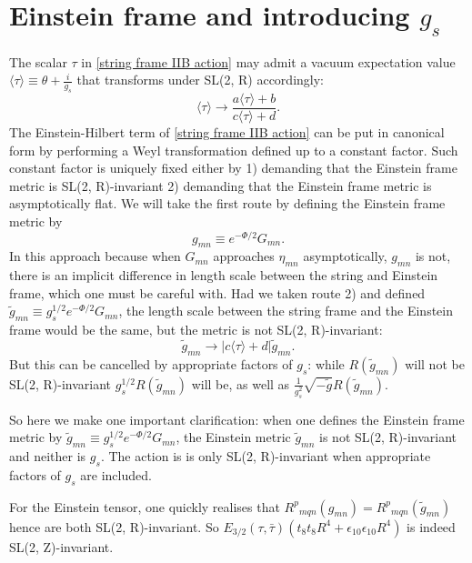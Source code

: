 \section{Einstein frame and introducing $g_s$}
The scalar $\tau$ in \eqref{string frame IIB action} may admit a vacuum expectation value
$\langle\tau\rangle \equiv \theta + \frac{i}{g_s}$
that transforms under SL(2, R) accordingly:
\begin{equation}
\langle\tau\rangle\to \frac{a\langle\tau\rangle+b}{c\langle\tau\rangle+d}.
\end{equation}
The Einstein-Hilbert term of \eqref{string frame IIB action} can be put in canonical form by performing a Weyl transformation defined up to a constant factor.
Such constant factor is uniquely fixed either by 1) demanding that the Einstein frame metric is SL(2, R)-invariant 2) demanding that the Einstein frame metric is asymptotically flat. We will take the first route by defining the Einstein frame metric by
\begin{equation}
g_{mn} \equiv e^{-\Phi/2}G_{mn}.
\label{Einstein frame metric definition}
\end{equation}
In this approach because when $G_{mn}$ approaches $\eta_{mn}$ asymptotically, $g_{mn}$ is not, there is an implicit difference in length scale between the string and Einstein frame, which one must be careful with.
Had we taken route 2) and defined $\tilde{g}_{mn} \equiv g_s^{1/2}e^{-\Phi/2}G_{mn}$, the length scale between the string frame and the Einstein frame would be the same, but the metric is not SL(2, R)-invariant:
\begin{equation}
\tilde{g}_{mn} \to |c\langle\tau\rangle + d| \tilde{g}_{mn}.
\end{equation}
But this can be cancelled by appropriate factors of $g_s$: while $R(\tilde{g}_{mn})$ will not be SL(2, R)-invariant $g_s^{1/2}R(\tilde{g}_{mn})$ will be, as well as $\frac{1}{g_s^2}\sqrt{-\tilde{g}}R(\tilde{g}_{mn})$.

So here we make one important clarification: when one defines the Einstein frame metric by $\tilde{g}_{mn} \equiv g_s^{1/2}e^{-\Phi/2}G_{mn}$, the Einstein metric $\tilde{g}_{mn}$ is not SL(2, R)-invariant and neither is $g_s$.
The action is is only SL(2, R)-invariant when appropriate factors of $g_s$ are included.

For the Einstein tensor, one quickly realises that $R^p{}_{mqn}(g_{mn}) = R^p{}_{mqn}(\tilde{g}_{mn})$ hence are both SL(2, R)-invariant. So $E_{3/2}(\tau,\bar{\tau})(t_8t_8R^4+\epsilon_{10}\epsilon_{10}R^4)$ is indeed SL(2, Z)-invariant.

